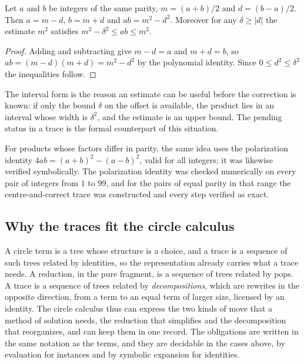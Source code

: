 \begin{proposition}\label{prop:centre}
Let $a$ and $b$ be integers of the same parity, $m=(a+b)/2$ and $d=(b-a)/2$. Then $a=m-d$, $b=m+d$ and $ab=m^2-d^2$. Moreover for any $\delta\ge|d|$ the estimate $m^2$ satisfies $m^2-\delta^2\le ab\le m^2$.
\end{proposition}

\begin{proof}
Adding and subtracting give $m-d=a$ and $m+d=b$, so $ab=(m-d)(m+d)=m^2-d^2$ by the polynomial identity. Since $0\le d^2\le\delta^2$ the inequalities follow.
\end{proof}

The interval form is the reason an estimate can be useful before the correction is known: if only the bound $\delta$ on the offset is available, the product lies in an interval whose width is $\delta^2$, and the estimate is an upper bound. The pending status in a trace is the formal counterpart of this situation.

For products whose factors differ in parity, the same idea uses the polarization identity $4ab=(a+b)^2-(a-b)^2$, valid for all integers; it was likewise verified symbolically. The polarization identity was checked numerically on every pair of integers from $1$ to $99$, and for the \factPolyPairs{} pairs of equal parity in that range the centre-and-correct trace was constructed and every step verified as exact.

\subsection{Why the traces fit the circle calculus}

A circle term is a tree whose structure is a choice, and a trace is a sequence of such trees related by identities, so the representation already carries what a trace needs. A reduction, in the pure fragment, is a sequence of trees related by pops. A trace is a sequence of trees related by \emph{decompositions}, which are rewrites in the opposite direction, from a term to an equal term of larger size, licensed by an identity. The circle calculus thus can express the two kinds of move that a method of solution needs, the reduction that simplifies and the decomposition that reorganizes, and can keep them in one record. The obligations are written in the same notation as the terms, and they are decidable in the cases above, by evaluation for instances and by symbolic expansion for identities.

